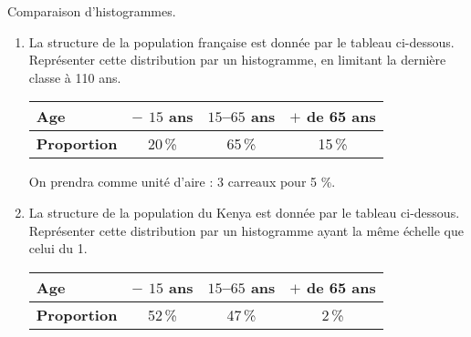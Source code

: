 
\begin{exercice}\label{exoSeconde-0040}


Comparaison d'histogrammes.
\begin{enumerate}
\item La structure de la population française est donnée par le
  tableau ci-dessous. Représenter cette distribution par un
  histogramme, en limitant la dernière classe à 110 ans.
  
  \begin{center}
    \begin{tabular}{|l|c|c|c|}
      \hline
      \textbf{Age} & $-$ $15$ ans & $15$--$65$ ans & $+$ de 65 ans \\
      \hline
      \textbf{Proportion} & 20\,\% & 65\,\% & 15\,\% \\
      \hline
    \end{tabular}      
  \end{center}
  
  On prendra comme unité d'aire : 3 carreaux pour 5 \%.

\item La structure de la population du Kenya est donnée par le tableau
  ci-dessous. Représenter cette distribution par un histogramme ayant
  la même échelle que celui du 1.

  \begin{center}
    \begin{tabular}{|l|c|c|c|}
      \hline
      \textbf{Age} & $-$ $15$ ans & $15$--$65$ ans & $+$ de 65 ans \\
      \hline
      \textbf{Proportion} & 52\,\% & 47\,\% & 2\,\% \\
      \hline
    \end{tabular}      
  \end{center}
  
\end{enumerate}



\end{exercice}
